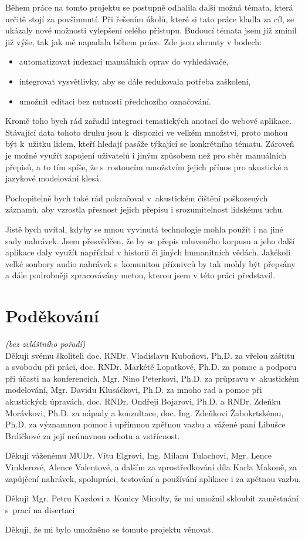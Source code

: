 Během práce na tomto projektu se postupně odhalila další možná témata, která určitě stojí za povšimnutí.
Při řešením úkolů, které si tato práce kladla za cíl, se ukázaly nové možnosti
vylepšení celého přístupu. Budoucí témata jsem již zmínil již výše, tak jak mě
napadala během práce. Zde jsou shrnuty v bodech:

\begin{itemize}
\item{automatizovat indexaci manuálních oprav do vyhledávače,}
\item{integrovat vysvětlivky, aby se dále redukovala potřeba zaškolení,}
\item{umožnit editaci bez nutnosti předchozího označování.}
\end{itemize}

Kromě toho bych rád zařadil integraci tematických anotací do webové aplikace.
Stávající data tohoto druhu jsou k~dispozici ve velkém množství, proto mohou být
k~užitku lidem, kteří hledají pasáže týkající se konkrétního tématu. Zároveň je
možné využít zapojení uživatelů i jiným způsobem než pro sběr manuálních
přepisů, a to tím spíše, že s~rostoucím množstvím jejich přínos pro akustické a
jazykové modelování klesá.


Pochopitelně bych také rád pokračoval v~akustickém čištění poškozených záznamů,
aby vzrostla přesnost jejich přepisu i srozumitelnost lidskému uchu.

Jistě bych uvítal, kdyby se mnou vyvinutá technologie mohla použít i na jiné
sady nahrávek. Jsem přesvědčen, že by se přepis mluveného korpusu a jeho další
aplikace daly využít například v historii či jiných humanitních vědách. Jakékoli
velké soubory audio nahrávek s~komunitou příznivců by tak mohly být přepsány a
dále podrobněji zpracovávány metou, kterou jsem v této práci představil.


\section{Poděkování}

{\em (bez zvláštního pořadí)}\\

Děkuji
svému školiteli doc. RNDr. Vladislavu Kuboňovi, Ph.D. za vřelou záštitu a svobodu při práci,
doc. RNDr. Markétě Lopatkové, Ph.D. za pomoc a podporu při účasti na konferencích,
Mgr. Nino Peterkovi, Ph.D. za průpravu v~akustickém modelování, 
Mgr. Davidu Klusáčkovi, Ph.D. za mnoho rad a pomoc při akustických úpravách,
doc. RNDr. Ondřeji Bojarovi, Ph.D.
a RNDr. Zdeňku Morávkovi, Ph.D. za nápady a konzultace,
doc. Ing. Zdeňkovi Žabokrtskému, Ph.D. za významnou pomoc i upřímnou zpětnou vazbu
a vážené paní Libušce Brdičkové za její neúnavnou ochotu a vstřícnost.

Děkuji
váženému MUDr. Vítu Elgrovi,
Ing. Milanu Tulachovi,
Mgr. Lence Vinklerové,
Alence Valentové,
a dalším za zprostředkování díla Karla Makoně, za zapůjčení nahrávek,
spolupráci, testování a používání aplikace i za zpětnou vazbu.

Děkuji
Mgr. Petru Kazdovi z~Konicy Minolty, že mi umožnil skloubit zaměstnání s~prací na disertaci

Děkuji, že mi bylo umožněno se tomuto projektu věnovat.

